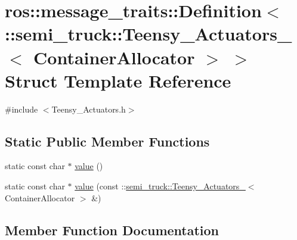\hypertarget{structros_1_1message__traits_1_1_definition_3_01_1_1semi__truck_1_1_teensy___actuators___3_01_container_allocator_01_4_01_4}{}\section{ros\+:\+:message\+\_\+traits\+:\+:Definition$<$ \+:\+:semi\+\_\+truck\+:\+:Teensy\+\_\+\+Actuators\+\_\+$<$ Container\+Allocator $>$ $>$ Struct Template Reference}
\label{structros_1_1message__traits_1_1_definition_3_01_1_1semi__truck_1_1_teensy___actuators___3_01_container_allocator_01_4_01_4}


{\ttfamily \#include $<$Teensy\+\_\+\+Actuators.\+h$>$}

\subsection*{Static Public Member Functions}
\begin{DoxyCompactItemize}
\item 
static const char $\ast$ \hyperlink{structros_1_1message__traits_1_1_definition_3_01_1_1semi__truck_1_1_teensy___actuators___3_01_container_allocator_01_4_01_4_aa3ed8d9ede4dc4c925b1486f17e0054b}{value} ()
\item 
static const char $\ast$ \hyperlink{structros_1_1message__traits_1_1_definition_3_01_1_1semi__truck_1_1_teensy___actuators___3_01_container_allocator_01_4_01_4_a672cfba4a1d48ce01673e856d89eb862}{value} (const \+::\hyperlink{structsemi__truck_1_1_teensy___actuators__}{semi\+\_\+truck\+::\+Teensy\+\_\+\+Actuators\+\_\+}$<$ Container\+Allocator $>$ \&)
\end{DoxyCompactItemize}


\subsection{Member Function Documentation}

